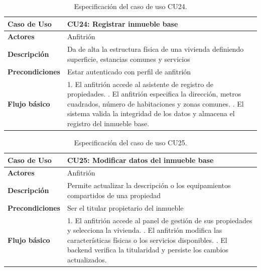 \begin{table}[H]
\centering
\begin{tabular}{|p{3.1cm}|p{10.9cm}|}
\hline
\textbf{Caso de Uso} & \textbf{CU24: Registrar inmueble base} \\ \hline
\textbf{Actores} & Anfitrión \\ \hline
\textbf{Descripción} & Da de alta la estructura física de una vivienda definiendo superficie, estancias comunes y servicios \\ \hline
\textbf{Precondiciones} & Estar autenticado con perfil de anfitrión \\ \hline
\textbf{Flujo básico} & 
1. El anfitrión accede al asistente de registro de propiedades. \newline
2. El anfitrión especifica la dirección, metros cuadrados, número de habitaciones y zonas comunes. \newline
3. El sistema valida la integridad de los datos y almacena el registro del inmueble base. \\ \hline
\end{tabular}
\caption{Especificación del caso de uso CU24.}
\label{tab:cu24}
\end{table}

\begin{table}[H]
\centering
\begin{tabular}{|p{3.1cm}|p{10.9cm}|}
\hline
\textbf{Caso de Uso} & \textbf{CU25: Modificar datos del inmueble base} \\ \hline
\textbf{Actores} & Anfitrión \\ \hline
\textbf{Descripción} & Permite actualizar la descripción o los equipamientos compartidos de una propiedad \\ \hline
\textbf{Precondiciones} & Ser el titular propietario del inmueble \\ \hline
\textbf{Flujo básico} & 
1. El anfitrión accede al panel de gestión de sus propiedades y selecciona la vivienda. \newline
2. El anfitrión modifica las características físicas o los servicios disponibles. \newline
3. El backend verifica la titularidad y persiste los cambios actualizados. \\ \hline
\end{tabular}
\caption{Especificación del caso de uso CU25.}
\label{tab:cu25}
\end{table}

